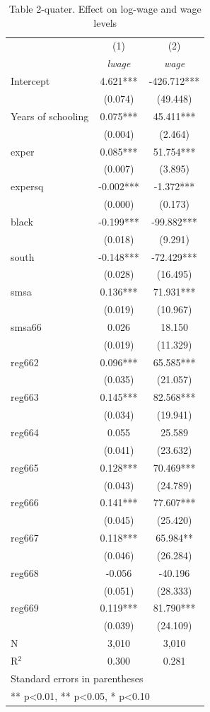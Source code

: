 \begin{table}[htbp]
\centering
\caption{Table 2-quater. Effect on log-wage and wage levels}
\begin{tabular}{lcc}
\hline\hline
 & (1) & (2) \\
 & \textit{lwage} & \textit{wage} \\
\hline
Intercept & 4.621*** & -426.712*** \\
 & (0.074) & (49.448) \\
Years of schooling & 0.075*** & 45.411*** \\
 & (0.004) & (2.464) \\
exper & 0.085*** & 51.754*** \\
 & (0.007) & (3.895) \\
expersq & -0.002*** & -1.372*** \\
 & (0.000) & (0.173) \\
black & -0.199*** & -99.882*** \\
 & (0.018) & (9.291) \\
south & -0.148*** & -72.429*** \\
 & (0.028) & (16.495) \\
smsa & 0.136*** & 71.931*** \\
 & (0.019) & (10.967) \\
smsa66 & 0.026 & 18.150 \\
 & (0.019) & (11.329) \\
reg662 & 0.096*** & 65.585*** \\
 & (0.035) & (21.057) \\
reg663 & 0.145*** & 82.568*** \\
 & (0.034) & (19.941) \\
reg664 & 0.055 & 25.589 \\
 & (0.041) & (23.632) \\
reg665 & 0.128*** & 70.469*** \\
 & (0.043) & (24.789) \\
reg666 & 0.141*** & 77.607*** \\
 & (0.045) & (25.420) \\
reg667 & 0.118*** & 65.984** \\
 & (0.046) & (26.284) \\
reg668 & -0.056 & -40.196 \\
 & (0.051) & (28.333) \\
reg669 & 0.119*** & 81.790*** \\
 & (0.039) & (24.109) \\
\hline
N & 3,010 & 3,010 \\
R$^2$ & 0.300 & 0.281 \\
\hline\hline
\multicolumn{3}{l}{\footnotesize Standard errors in parentheses} \\
\multicolumn{3}{l}{\footnotesize *** p<0.01, ** p<0.05, * p<0.10} \\
\end{tabular}
\end{table}